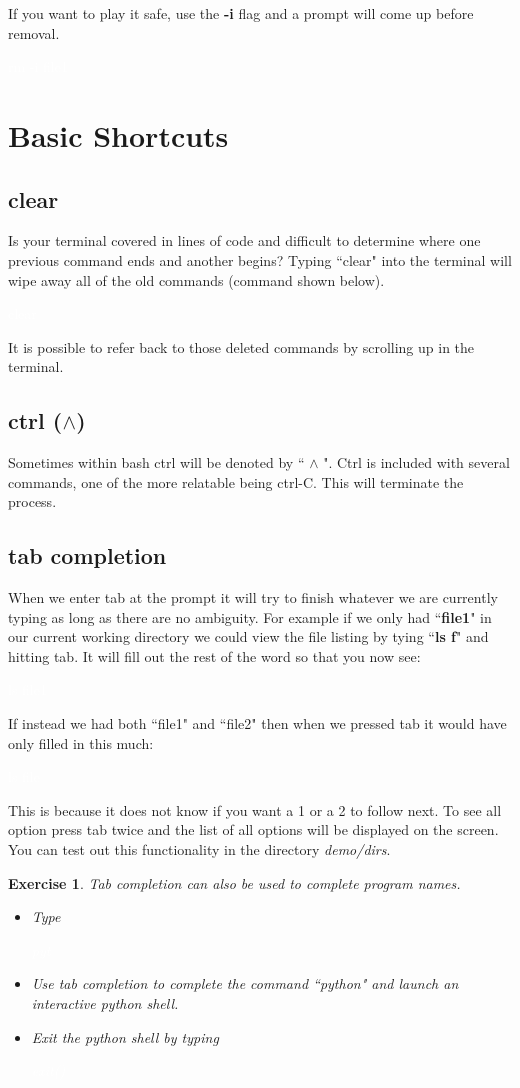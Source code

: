 \documentclass[oneside]{book}
\newcommand{\commandline}[1]{\begin{center} \colorbox{Dark}{\textcolor{white}{#1}} \end{center}}
\newtheorem{ex}{Exercise}[chapter]
\begin{document}
If you want to play it safe, use the \textbf{-i} flag and a prompt will come up before removal.\ 
\commandline{rm -i file1}

\section{Basic Shortcuts}

\subsection{clear}
Is your terminal covered in lines of code and difficult to determine where one previous command ends and another begins? Typing ``clear" into the terminal will wipe away all of the old commands (command shown below).
\commandline{clear}
It is possible to refer back to those deleted commands by scrolling up in the terminal.

\subsection{ctrl ($\wedge$)}
Sometimes within bash ctrl will be denoted by `` $\wedge$ ". Ctrl is included with several commands, one of the more relatable being ctrl-C. This will terminate the process. 

\subsection{tab completion}
When we enter tab at the prompt it will try to finish whatever we are currently typing as long as there are no ambiguity. For example if we only had ``\textbf{file1}" in our current working directory we could view the file listing by tying ``\textbf{ls f}" and hitting tab. It will fill out the rest of the word so that you now see:
\commandline{ls file1}
If instead we had both ``file1" and ``file2" then when we pressed tab it would have only filled in this much:
\commandline{ls file}
This is because it does not know if you want a 1 or a 2 to follow next. To see all option press tab twice and the list of all options will be displayed on the screen. You can test out this functionality in the directory \textit{demo/dirs}.\\

\begin{ex}
    Tab completion can also be used to complete program names.
    \begin{itemize} 
        \item Type \commandline{pyt}
        \item Use tab completion to complete the command ``python" and launch an interactive python shell.
        \item Exit the python shell by typing \commandline{exit()}
    \end{itemize}
\end{ex}
\end{document}
